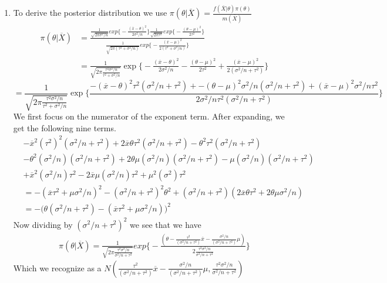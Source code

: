\documentclass[12pt]{article}  %
\begin{document}
\begin{enumerate}
\begin{enumerate}
		\item To derive the posterior distribution we use $\pi(\theta|\overline{X}) = \frac{f(\overline{X}|\theta)\pi(\theta)}{m(\overline{X})}$
		\begin{align*}
		\pi(\theta|\overline{X}) &= \frac{\frac{1}{\sqrt{2\pi\sigma^2/n}}exp\Big\{-\frac{(\overline{x}-\theta)^2}{2\sigma^2/n}\Big\}\frac{1}{\sqrt{2\pi\tau^2}}exp\Big\{-\frac{(\theta-\mu)^2}{2\tau^2}\Big\}}{\frac{1}{\sqrt{2\pi (\tau^2 + \sigma^2/n)}} exp\Big\{-\frac{(\overline{x}-\mu)^2}{2(\tau^2 + \sigma^2/n)}\Big\}}\\
		&= \frac{1}{\sqrt{2\pi\frac{\tau^2\sigma^2/n}{\tau^2 + \sigma^2/n}}}\exp\Big\{-\frac{(\overline{x}-\theta)^2}{2\sigma^2/n} -\frac{(\theta-\mu)^2}{2\tau^2}+\frac{(\overline{x}-\mu)^2}{2(\sigma^2/n +\tau^2)}\Big\}
		\end{align*}
		$$=\frac{1}{\sqrt{2\pi\frac{\tau^2\sigma^2/n}{\tau^2 + \sigma^2/n}}}\exp\Big\{\frac{-(\overline{x}-\theta)^2\tau^2(\sigma^2/n + \tau^2) + -(\theta-\mu)^2\sigma^2/n(\sigma^2/n + \tau^2) + (\overline{x}-\mu)^2\sigma^2/n\tau^2}{2\sigma^2/n\tau^2(\sigma^2/n + \tau^2)}\Big\}$$
		We first focus on the numerator of the exponent term. After expanding, we get the following nine terms. 
		\begin{align*}
			&-\overline{x}^2(\tau^2)^2(\sigma^2/n + \tau^2) + 2\overline{x}\theta\tau^2(\sigma^2/n + \tau^2)-\theta^2\tau^2(\sigma^2/n + \tau^2)\\
			& -\theta^2(\sigma^2/n)(\sigma^2/n + \tau^2) + 2\theta\mu(\sigma^2/n)(\sigma^2/n + \tau^2)-\mu(\sigma^2/n)(\sigma^2/n + \tau^2)\\
			&+\overline{x}^2(\sigma^2/n)\tau^2 - 2\overline{x}\mu(\sigma^2/n)\tau^2 + \mu^2(\sigma^2)\tau^2\\
			&= -(\overline{x}\tau^2 + \mu\sigma^2/n)^2 -(\sigma^2/n + \tau^2)^2\theta^2 + (\sigma^2/n +\tau^2)(2\overline{x}\theta\tau^2 + 2\theta\mu\sigma^2/n)\\
			&= -\Big(\theta(\sigma^2/n + \tau^2) - (\overline{x}\tau^2+\mu\sigma^2/n)\Big)^2
		\end{align*}
		Now dividing by $(\sigma^2/n + \tau^2)^2$ we see that we have 
		\begin{align*}
		\pi(\theta|\overline{X}) = \frac{1}{\sqrt{2\pi\frac{\tau^2\sigma^2/n}{\sigma^2/n + \tau^2}}}exp\Big\{-\frac{(\theta - \frac{\tau^2}{(\sigma^2/n + \tau^2)}\overline{x} - \frac{\sigma^2/n}{(\sigma^2/n + \tau^2)}\mu)}{2\frac{\tau^2\sigma^2/n}{\sigma^2/n + \tau^2}}\Big\}
		\end{align*}
		Which we recognize as a $N(\frac{\tau^2}{(\sigma^2/n + \tau^2)}\overline{x} - \frac{\sigma^2/n}{(\sigma^2/n + \tau^2)}\mu, \frac{\tau^2\sigma^2/n}{\sigma^2/n + \tau^2})$


\end{enumerate}
\end{enumerate}
\end{document}

